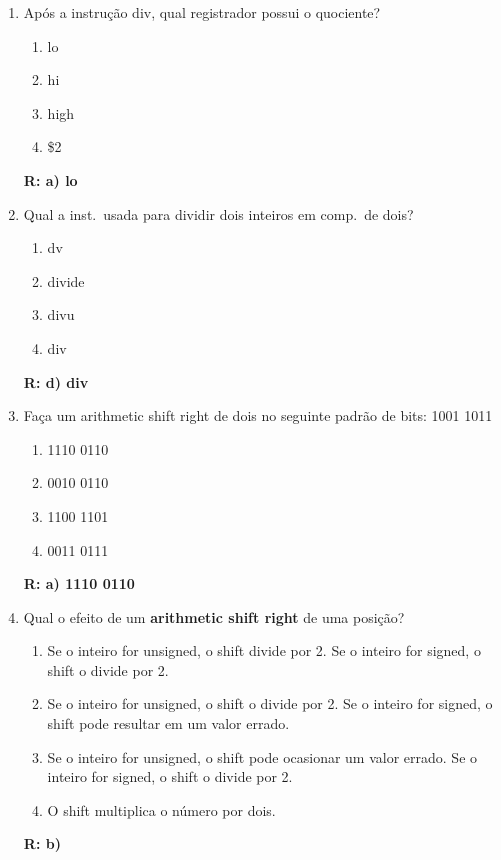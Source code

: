 \documentclass[a4paper,11pt,fleqn]{article}
\begin{document}
\begin{enumerate}
    \item{Após a instrução div, qual registrador possui o quociente?}
        \begin{enumerate}
            \item{lo}
            \item{hi}
            \item{high}
            \item{\$2}
        \end{enumerate}
        \textbf{R: a) lo }

    \item{Qual a inst.\ usada para dividir dois inteiros em comp.\ de dois?}
        \begin{enumerate}
            \item{dv}
            \item{divide}
            \item{divu}
            \item{div}
        \end{enumerate}
        \textbf{R: d) div}

    \item{Faça um arithmetic shift right de dois no seguinte padrão de bits: 1001 1011}
        \begin{enumerate}
            \item{1110 0110}
            \item{0010 0110}
            \item{1100 1101}
            \item{0011 0111}
        \end{enumerate}
        \textbf{R: a) 1110 0110}

    \item{Qual o efeito de um \textbf{arithmetic shift right} de uma posição?}
        \begin{enumerate}
            \item{Se o inteiro for unsigned, o shift divide por 2. Se o inteiro for signed, o shift o
                    divide por 2.}
            \item{Se o inteiro for unsigned, o shift o divide por 2. Se o inteiro for signed, o shift
                    pode resultar em um valor errado.}
            \item{Se o inteiro for unsigned, o shift pode ocasionar um valor errado. Se o inteiro for
                    signed, o shift o divide por 2.}
            \item{O shift multiplica o número por dois.}
        \end{enumerate}
        \textbf{R: b) }
        \newpage


\end{enumerate}
\end{document}
